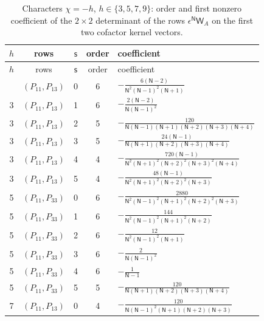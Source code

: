 \documentclass{amsart}
\theoremstyle{definition}
\theoremstyle{remark}
\numberwithin{equation}{section}
\begin{document}
{\small\renewcommand{\arraystretch}{1.9}
\begin{longtable}{ccccl}
\caption{Characters $\chi=-h$, $h\in\{3,5,7,9\}$: order and first nonzero coefficient of the $2\times2$ determinant of the rows $\epsilon^{\mathsf N}\mathsf W_A$ on the first two cofactor kernel vectors.}\label{tab:twoall}\\
\toprule $h$&rows&$\mathsf s$&order&coefficient\\\midrule\endfirsthead
\toprule $h$&rows&$\mathsf s$&order&coefficient\\\midrule\endhead
\bottomrule\endfoot
3&$(P_{11},P_{13})$&0&6&$\displaystyle -\frac{6(\mathsf N - 2)}{\mathsf N^{2}(\mathsf N - 1)^{2}(\mathsf N + 1)}$\\
3&$(P_{11},P_{13})$&1&6&$\displaystyle -\frac{2(\mathsf N - 2)}{\mathsf N(\mathsf N - 1)^{2}}$\\
3&$(P_{11},P_{13})$&2&5&$\displaystyle -\frac{120}{\mathsf N(\mathsf N - 1)(\mathsf N + 1)(\mathsf N + 2)(\mathsf N + 3)(\mathsf N + 4)}$\\
3&$(P_{11},P_{13})$&3&5&$\displaystyle -\frac{24(\mathsf N - 1)}{\mathsf N(\mathsf N + 1)(\mathsf N + 2)(\mathsf N + 3)(\mathsf N + 4)}$\\
3&$(P_{11},P_{13})$&4&4&$\displaystyle -\frac{720(\mathsf N - 1)}{\mathsf N^{2}(\mathsf N + 1)^{2}(\mathsf N + 2)^{2}(\mathsf N + 3)^{2}(\mathsf N + 4)}$\\
3&$(P_{11},P_{13})$&5&4&$\displaystyle -\frac{48(\mathsf N - 1)}{\mathsf N^{2}(\mathsf N + 1)^{2}(\mathsf N + 2)^{2}(\mathsf N + 3)}$\\
5&$(P_{11},P_{33})$&0&6&$\displaystyle -\frac{2880}{\mathsf N^{2}(\mathsf N - 1)^{2}(\mathsf N + 1)^{2}(\mathsf N + 2)^{2}(\mathsf N + 3)}$\\
5&$(P_{11},P_{33})$&1&6&$\displaystyle -\frac{144}{\mathsf N^{2}(\mathsf N - 1)^{2}(\mathsf N + 1)^{2}(\mathsf N + 2)}$\\
5&$(P_{11},P_{33})$&2&6&$\displaystyle -\frac{12}{\mathsf N^{2}(\mathsf N - 1)^{2}(\mathsf N + 1)}$\\
5&$(P_{11},P_{33})$&3&6&$\displaystyle -\frac{2}{\mathsf N(\mathsf N - 1)^{2}}$\\
5&$(P_{11},P_{33})$&4&6&$\displaystyle -\frac{1}{\mathsf N - 1}$\\
5&$(P_{11},P_{33})$&5&5&$\displaystyle -\frac{120}{\mathsf N(\mathsf N + 1)(\mathsf N + 2)(\mathsf N + 3)(\mathsf N + 4)}$\\
7&$(P_{11},P_{13})$&0&4&$\displaystyle -\frac{120}{\mathsf N(\mathsf N - 1)^{2}(\mathsf N + 1)(\mathsf N + 2)(\mathsf N + 3)}$\\

\end{longtable}}
\end{document}
